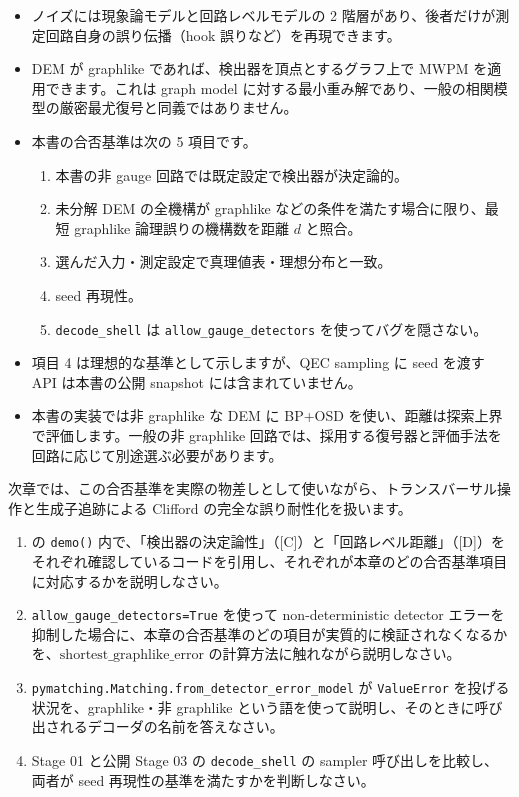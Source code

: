 \begin{itemize}
  \item ノイズには現象論モデルと回路レベルモデルの 2 階層があり、後者だけが測定回路自身の誤り伝播（hook 誤りなど）を再現できます。
  \item DEM が graphlike であれば、検出器を頂点とするグラフ上で MWPM を適用できます。これは graph model に対する最小重み解であり、一般の相関模型の厳密最尤復号と同義ではありません。
  \item 本書の合否基準は次の 5 項目です。
    \begin{enumerate}
      \item 本書の非 gauge 回路では既定設定で検出器が決定論的。
      \item 未分解 DEM の全機構が graphlike などの条件を満たす場合に限り、最短 graphlike 論理誤りの機構数を距離 $d$ と照合。
      \item 選んだ入力・測定設定で真理値表・理想分布と一致。
      \item seed 再現性。
      \item \texttt{decode\_shell} は \texttt{allow\_gauge\_detectors} を使ってバグを隠さない。
    \end{enumerate}
  \item 項目 4 は理想的な基準として示しますが、QEC sampling に seed を渡す API は本書の公開 snapshot には含まれていません。
  \item 本書の実装では非 graphlike な DEM に BP+OSD を使い、距離は探索上界で評価します。一般の非 graphlike 回路では、採用する復号器と評価手法を回路に応じて別途選ぶ必要があります。
\end{itemize}

次章では、この合否基準を実際の物差しとして使いながら、トランスバーサル操作と生成子追跡による Clifford の完全な誤り耐性化を扱います。

\begin{exercise}
  \begin{enumerate}
    \item {} の \texttt{demo()} 内で、「検出器の決定論性」（[C]）と「回路レベル距離」（[D]）をそれぞれ確認しているコードを引用し、それぞれが本章のどの合否基準項目に対応するかを説明しなさい。
    \item \texttt{allow\_gauge\_detectors=True} を使って non-deterministic detector エラーを抑制した場合に、本章の合否基準のどの項目が実質的に検証されなくなるかを、$\mathrm{shortest\_graphlike\_error}$ の計算方法に触れながら説明しなさい。
    \item \texttt{pymatching.Matching.from\_detector\_error\_model} が \texttt{ValueError} を投げる状況を、graphlike・非 graphlike という語を使って説明し、そのときに呼び出されるデコーダの名前を答えなさい。
    \item Stage 01 と公開 Stage 03 の \texttt{decode\_shell} の sampler 呼び出しを比較し、両者が seed 再現性の基準を満たすかを判断しなさい。
  \end{enumerate}
\end{exercise}
